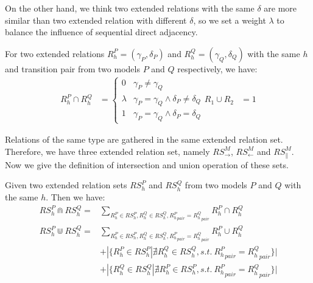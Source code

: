 \documentclass[dvips,...]{llncs}
\begin{document}
On the other hand, we think two extended relations with the same $\delta$ are more similar than two extended relation with different $\delta$, so we set a weight $\lambda$ to balance the influence of sequential direct adjacency.

For two extended relations $R_{h}^{P}=(\gamma_{P},\delta_{P})$ and $R_{h}^{Q}=(\gamma_{Q},\delta_{Q})$ with the same $h$ and transition pair from two models $P$ and $Q$ respectively, we have:
\begin{equation}\label{eq:relationOperations}
	\begin{aligned}
		R_{h}^{P}\cap R_{h}^{Q}&=
			\begin{cases}
				0 & \gamma_{P}\neq\gamma_{Q}\\
				\lambda & \gamma_{P}=\gamma_{Q}\wedge\delta_{P}\neq\delta_{Q}\\
				1 & \gamma_{P}=\gamma_{Q}\wedge\delta_{P}=\delta_{Q}
			\end{cases}
		R_{1}\cup R_{2}&=1
	\end{aligned}
\end{equation}

Relations of the same type are gathered in the same extended relation set. Therefore, we have three extended relation set, namely $RS_{\rightarrow}^{M}$, $RS_{\leftarrow}^{M}$ and $RS_{\parallel}^{M}$.  Now we give the definition of intersection and union operation of these sets.

\begin{definition}\label{def:relSetOperations}
Given two extended relation sets $RS_{h}^{P}$ and $RS_{h}^{Q}$ from two models $P$ and $Q$ with the same $h$. Then we have:
		\begin{align}
			RS_{h}^{P}\Cap RS_{h}^{Q}= & \sum_{R_{h}^{P}\in RS_{h}^{P},R_{h}^{Q}\in RS_{h}^{Q},{R_{h}^{P}}_{pair}={R_{h}^{Q}}_{pair}}{R_{h}^{P}\cap R_{h}^{Q}}\label{eq:RSintersection}\\
			RS_{h}^{P}\Cup RS_{h}^{Q}= & \sum_{R_{h}^{P}\in RS_{h}^{P},R_{h}^{Q}\in RS_{h}^{Q},{R_{h}^{P}}_{pair}={R_{h}^{Q}}_{pair}}{R_{h}^{P}\cup R_{h}^{Q}}\label{eq:RSunion1}\\
			& +|\{R_{h}^{P}\in RS_{h}^{P}|\nexists R_{h}^{Q}\in RS_{h}^{Q},s.t.~{R_{h}^{P}}_{pair}={R_{h}^{Q}}_{pair}\}|\label{eq:RSunion2}\\
			& +|\{R_{h}^{Q}\in RS_{h}^{Q}|\nexists R_{h}^{P}\in RS_{h}^{P},s.t.~{R_{h}^{P}}_{pair}={R_{h}^{Q}}_{pair}\}|\label{eq:RSunion3}
		\end{align}
\end{definition}
\end{document}
